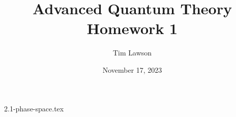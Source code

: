 \documentclass[a4paper]{extarticle}
\title{Advanced Quantum Theory\\
\large Homework 1}
\author{Tim Lawson}
\date{November 17, 2023}
\begin{document}
\maketitle

\setcounter{section}{2}
{2.1-phase-space.tex}
\end{document}
